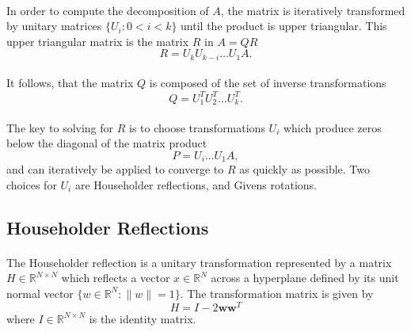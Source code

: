 \documentclass{article}
\begin{document}
\paragraph{}
In order to compute the decomposition of $A$, the matrix is iteratively transformed by unitary matrices $\{U_i : 0 < i < k\}$ until the product is upper triangular. This upper triangular matrix is the matrix $R$ in $A = QR$
\begin{equation}
R = U_kU_{k-i} \dots U_1A.
\end{equation}
\paragraph{}
It follows, that the matrix $Q$ is composed of the set of inverse transformations
\begin{equation}
Q = U_{1}^{T}U_{2}^{T} \dots U_{k}^{T}.
\end{equation}
\paragraph{}
The key to solving for $R$ is to choose transformations $U_i$ which produce zeros below the diagonal of the matrix product
\begin{equation}
P = U_{i} \dots U_1A,
\end{equation}
and can iteratively be applied to converge to $R$ as quickly as possible. Two choices for $U_i$ are Householder reflections, and Givens rotations.

\subsection{Householder Reflections}
\paragraph{}
The Householder reflection is a unitary transformation represented by a matrix $H\in\mathbb{R}^{N\times{}N}$ which reflects a vector $x\in\mathbb{R}^N$ across a hyperplane defined by its unit normal vector $\{w\in\mathbb{R}^N: \|w\|=1\}$. The transformation matrix is given by
\begin{equation}
H = I - 2\mathbf{ww}^T
\end{equation}
where $I\in\mathbb{R}^{N\times{}N}$ is the identity matrix. \cite{bhaskar86}
\end{document}
